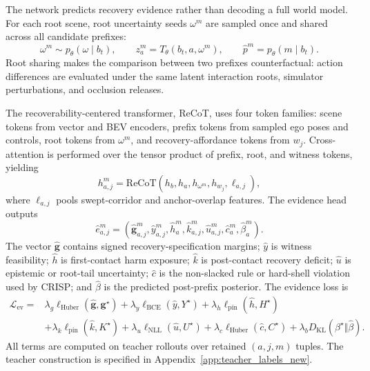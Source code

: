 \documentclass[conference]{IEEEtran}
\begin{document}
The network predicts recovery evidence rather than decoding a full world model.  For each root scene, root uncertainty seeds $\omega^m$ are sampled once and shared across all candidate prefixes:
\begin{equation}
\label{eq:method_root_futures}
    \omega^m\sim p_\theta(\omega\mid b_t),\qquad
    z_a^m=T_\theta(b_t,a,\omega^m),\qquad
    \hat p^m=p_\theta(m\mid b_t).
\end{equation}
Root sharing makes the comparison between two prefixes counterfactual: action differences are evaluated under the same latent interaction roots, simulator perturbations, and occlusion releases.

The recoverability-centered transformer, ReCoT, uses four token families: scene tokens from vector and BEV encoders, prefix tokens from sampled ego poses and controls, root tokens from $\omega^m$, and recovery-affordance tokens from $w_j$.  Cross-attention is performed over the tensor product of prefix, root, and witness tokens, yielding
\begin{equation}
\label{eq:method_recot_tuple}
    h_{a,j}^{m}=\mathrm{ReCoT}(h_b,h_a,h_{\omega^m},h_{w_j},\ell_{a,j}),
\end{equation}
where $\ell_{a,j}$ pools swept-corridor and anchor-overlap features.  The evidence head outputs
\begin{equation}
\label{eq:method_evidence_new}
    \widehat e_{a,j}^{m}=\left(
    \widehat{\bm g}_{a,j}^{m},
    \widehat y_{a,j}^{m},
    \widehat h_{a}^{m},
    \widehat k_{a,j}^{m},
    \widehat u_{a,j}^{m},
    \widehat c_{a}^{m},
    \widehat\beta_a^m
    \right).
\end{equation}
The vector $\widehat{\bm g}$ contains signed recovery-specification margins; $\widehat y$ is witness feasibility; $\widehat h$ is first-contact harm exposure; $\widehat k$ is post-contact recovery deficit; $\widehat u$ is epistemic or root-tail uncertainty; $\widehat c$ is the non-slacked rule or hard-shell violation used by CRISP; and $\widehat\beta$ is the predicted post-prefix posterior.  The evidence loss is
\begin{equation}
\label{eq:method_evidence_loss}
\begin{split}
\mathcal L_{\mathrm{ev}}=
&\lambda_g\ell_{\mathrm{Huber}}(\widehat{\bm g},\bm g^\star)
+\lambda_y\ell_{\mathrm{BCE}}(\widehat y,Y^\star)
+\lambda_h\ell_{\mathrm{pin}}(\widehat h,H^\star)\\
&+\lambda_k\ell_{\mathrm{pin}}(\widehat k,K^\star)
+\lambda_u\ell_{\mathrm{NLL}}(\widehat u,U^\star)
+\lambda_c\ell_{\mathrm{Huber}}(\widehat c,C^\star)
+\lambda_b D_{\mathrm{KL}}(\beta^\star\Vert\widehat\beta).
\end{split}
\end{equation}
All terms are computed on teacher rollouts over retained $(a,j,m)$ tuples.  The teacher construction is specified in Appendix~\ref{app:teacher_labels_new}.
\end{document}
